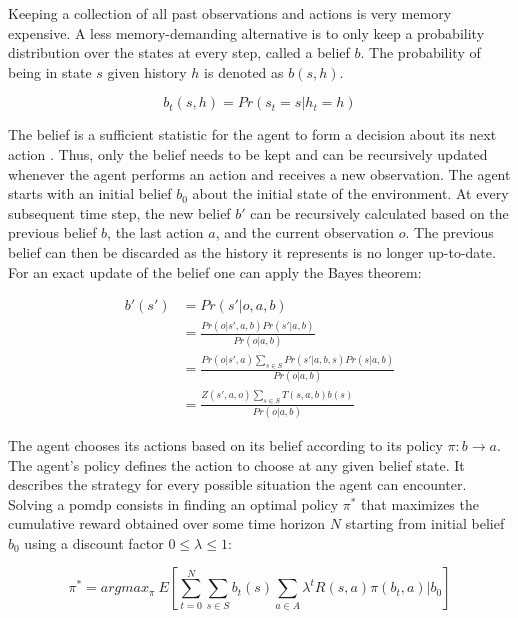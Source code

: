 Keeping a collection of all past observations and actions is very memory expensive. A less memory-demanding alternative is to only keep a probability distribution over the states at every step, called a belief $b$. The probability of being in state $s$ given history $h$ is denoted as $b(s,h)$. 

\begin{equation}
    b_t(s,h) = Pr(s_t = s|h_t = h)
\end{equation}

The belief is a sufficient statistic for the agent to form a decision about its next action \parencite{pomdp-belief}. Thus, only the belief needs to be kept and can be recursively updated whenever the agent performs an action and receives a new observation. The agent starts with an initial belief $b_0$ about the initial state of the environment. At every subsequent time step, the new belief $b'$ can be recursively calculated based on the previous belief $b$, the last action $a$, and the current observation $o$. The previous belief can then be discarded as the history it represents is no longer up-to-date. For an exact update of the belief one can apply the Bayes theorem:

\begin{equation}
    \label{eq:bayes_update}
    \begin{split}
        b'(s') & = Pr(s' | o, a , b) \\
               & = \frac{Pr(o | s', a, b)Pr(s' | a,b)}{Pr(o| a, b)} \\
               & = \frac{Pr(o | s', a)\sum_{s \in S}Pr(s' | a, b, s)Pr(s| a, b)}{Pr(o| a, b)} \\
               & = \frac{Z(s', a, o)\sum_{s \in S}T(s, a, b)b(s)}{Pr(o | a, b)}
    \end{split}
\end{equation}

\noindent
The agent chooses its actions based on its belief according to its policy $\pi: b \rightarrow a$. The agent's policy defines the action to choose at any given belief state. It describes the strategy for every possible situation the agent can encounter. Solving a \gls{pomdp} consists in finding an optimal policy $\pi^*$ that maximizes the cumulative reward obtained over some time horizon $N$ starting from initial belief $b_0$ using a discount factor $0 \leq \lambda \leq 1$:

\begin{equation}
    \pi^* = argmax_{\pi}~E\left[ \sum_{t=0}^{N} \sum_{s \in S}b_t(s) \sum_{a \in A} \lambda^t R(s,a) \pi(b_t,a) | b_0\right]
\end{equation}

